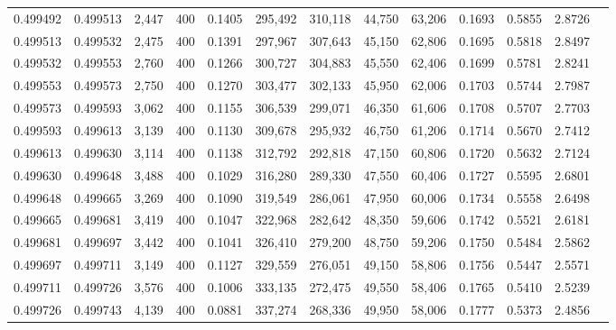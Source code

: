 \begin{tabular}{rrrrrrrrrrrrr}
0.499492 & 0.499513 & 2,447 & 400 &                                     0.1405 & 295,492 & 310,118 &  44,750 &  63,206 & 0.1693 & 0.5855 & 2.8726 \\
0.499513 & 0.499532 & 2,475 & 400 &                                     0.1391 & 297,967 & 307,643 &  45,150 &  62,806 & 0.1695 & 0.5818 & 2.8497 \\
0.499532 & 0.499553 & 2,760 & 400 &                                     0.1266 & 300,727 & 304,883 &  45,550 &  62,406 & 0.1699 & 0.5781 & 2.8241 \\
0.499553 & 0.499573 & 2,750 & 400 &                                     0.1270 & 303,477 & 302,133 &  45,950 &  62,006 & 0.1703 & 0.5744 & 2.7987 \\
0.499573 & 0.499593 & 3,062 & 400 &                                     0.1155 & 306,539 & 299,071 &  46,350 &  61,606 & 0.1708 & 0.5707 & 2.7703 \\
0.499593 & 0.499613 & 3,139 & 400 &                                     0.1130 & 309,678 & 295,932 &  46,750 &  61,206 & 0.1714 & 0.5670 & 2.7412 \\
0.499613 & 0.499630 & 3,114 & 400 &                                     0.1138 & 312,792 & 292,818 &  47,150 &  60,806 & 0.1720 & 0.5632 & 2.7124 \\
0.499630 & 0.499648 & 3,488 & 400 &                                     0.1029 & 316,280 & 289,330 &  47,550 &  60,406 & 0.1727 & 0.5595 & 2.6801 \\
0.499648 & 0.499665 & 3,269 & 400 &                                     0.1090 & 319,549 & 286,061 &  47,950 &  60,006 & 0.1734 & 0.5558 & 2.6498 \\
0.499665 & 0.499681 & 3,419 & 400 &                                     0.1047 & 322,968 & 282,642 &  48,350 &  59,606 & 0.1742 & 0.5521 & 2.6181 \\
0.499681 & 0.499697 & 3,442 & 400 &                                     0.1041 & 326,410 & 279,200 &  48,750 &  59,206 & 0.1750 & 0.5484 & 2.5862 \\
0.499697 & 0.499711 & 3,149 & 400 &                                     0.1127 & 329,559 & 276,051 &  49,150 &  58,806 & 0.1756 & 0.5447 & 2.5571 \\
0.499711 & 0.499726 & 3,576 & 400 &                                     0.1006 & 333,135 & 272,475 &  49,550 &  58,406 & 0.1765 & 0.5410 & 2.5239 \\
0.499726 & 0.499743 & 4,139 & 400 &                                     0.0881 & 337,274 & 268,336 &  49,950 &  58,006 & 0.1777 & 0.5373 & 2.4856 \\

\end{tabular}
